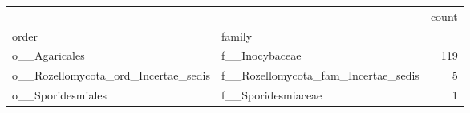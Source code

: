 \begin{tabular}{llr}
\toprule
 &  & count \\
order & family &  \\
\midrule
o\_\_Agaricales & f\_\_Inocybaceae & 119 \\
\cline{1-3}
o\_\_Rozellomycota\_ord\_Incertae\_sedis & f\_\_Rozellomycota\_fam\_Incertae\_sedis & 5 \\
\cline{1-3}
o\_\_Sporidesmiales & f\_\_Sporidesmiaceae & 1 \\
\cline{1-3}
\bottomrule
\end{tabular}
